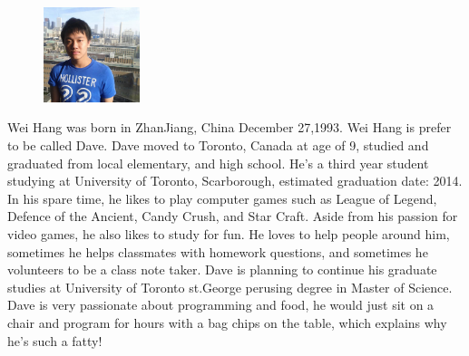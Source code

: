 \documentclass[pdftex,10pt,a4paper]{report}
\begin{document}
\begin{figure}
  \vspace{-20pt}
  \begin{center}
    \includegraphics[width=0.25\textwidth]{img/group/dave}
  \end{center}
  \vspace{-20pt}
\end{figure}
Wei Hang was born in ZhanJiang, China December 27,1993. Wei Hang is prefer to be called Dave. Dave moved to Toronto, Canada at age of 9, studied and graduated from local elementary, and high school. He's a third year student studying at University of Toronto, Scarborough, estimated graduation date: 2014. In his spare time, he likes to play computer games such as League of Legend, Defence of the Ancient, Candy Crush, and Star Craft. Aside from his passion for video games, he also likes to study for fun. He loves to help people around him, sometimes he helps classmates with homework questions, and sometimes he volunteers to be a class note taker. Dave is planning to continue his graduate studies at University of Toronto st.George perusing degree in Master of Science. Dave is very passionate about programming and food, he would just sit on a chair and program for hours with a bag chips on the table, which explains why he's such a fatty! \\
\end{document}
